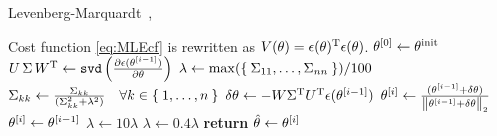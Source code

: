 \begin{algorithm}
\caption{Levenberg-Marquardt~\citep{Marquardt1963}, \citep[Sec. 9.L.4]{Pintelon2012}}\label{LMalgo}
\begin{algorithmic}[1]
  \Require Cost function \eqref{eq:MLEcf} is rewritten as $V(\theta) = \epsilon(\theta)^{\TT} \epsilon(\theta)$. 
   \State $\atIter[0]{\theta} \gets \theta^{\mathrm{init}}$
      \State $U \, \Sigma \, W^{\TT} \gets \code{svd}\left( \frac{\partial \epsilon(\atIter[i-1]{\theta})}{\partial \theta}\right)$ 
        \State $\lambda \gets \max(\Set{\Sigma_{11}, \ldots, \Sigma_{nn}})/100$
      \EndIf
      \State $\Sigma_{kk} \gets \frac{\Sigma_{kk}}{(\Sigma_{kk}^2 + \lambda^2)} \quad \forall k \in \Set{1, \ldots, n}$
      \State $\delta\theta \gets - W  \Sigma^{\TT}  U^{\TT} \epsilon(\atIter[i-1]{\theta})$
      \State $\atIter[i]{\theta} \gets \frac{(\atIter[i-1]{\theta} + \delta\theta) }{ \norm[2]{\atIter[i-1]{\theta} + \delta\theta} }$
       
         \State $\atIter[i]{\theta} \gets \atIter[i-1]{\theta}$ 
          \State $\lambda \gets 10 \lambda$ 
      \Else
          \State $\lambda \gets 0.4 \lambda$
      \EndIf
          \State \textbf{return} $\hat{\theta} \gets \atIter[i]{\theta}$
      \EndIf
   \EndFor
\EndFunction
\end{algorithmic}
\end{algorithm}

